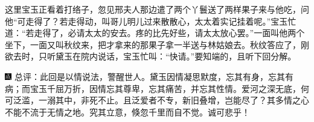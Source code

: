 这里宝玉正看着打络子，忽见邢夫人那边遣了两个丫鬟送了两样果子来与他吃，问他“可走得了？若走得动，叫哥儿明儿过来散散心，太太着实记挂着呢。”宝玉忙道：“若走得了，必请太太的安去。疼的比先好些，请太太放心罢。”一面叫他两个坐下，一面又叫秋纹来，把才拿来的那果子拿一半送与林姑娘去。秋纹答应了，刚欲去时，只听黛玉在院内说话，宝玉忙叫：“快请。”要知端的，且听下回分解。

{\includegraphics[width=3mm]{../Images/00005}  \kaishu 总评：此回是以情说法，警醒世人。黛玉因情凝思默度，忘其有身，忘其有病；而宝玉千屈万折，因情忘其尊卑，忘其痛苦，并忘其性情。爱河之深无底，何可泛滥，一溺其中，非死不止。且泛爱者不专，新旧叠增，岂能尽了？其多情之心不能不流于无情之地。究其立意，倏忽千里而自不觉。诚可悲乎！}
